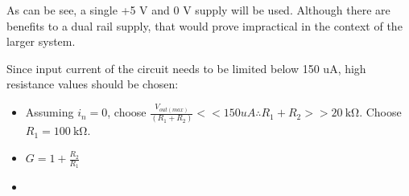 As can be see, a single +5 V and 0 V supply will be used. Although there are benefits to a dual rail supply, that would prove impractical
in the context of the larger system.



\pagebreak
Since input current of the circuit needs to be limited below 150 uA, high resistance values should be chosen:
\begin{itemize}
  \item Assuming $i_n = 0$, choose $\frac{V_{out(max)}}{(R_1 + R_2)} << 150 uA \therefore R_1 + R_2 >> \SI{20}{\kilo\ohm}$. Choose $R_1 = \SI{100}{\kilo\ohm}$.
  \item $G = 1 + \frac{R_2}{R_1}$
  \item 
\end{itemize}